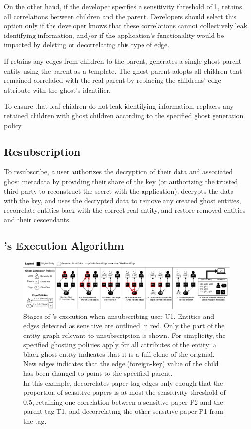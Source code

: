 On the other hand, if the developer specifies a sensitivity threshold of 1, \sys retains all
correlations between children and the parent. Developers should select this option only if the
developer knows that these correlations cannot collectively leak identifying information, and/or if
the application's functionality would be impacted by deleting or decorrelating this type of edge.

If \sys retains any edges from children to the parent, \sys generates a single ghost parent entity using the
parent as a template. The ghost parent adopts all children that remained correlated with the real
parent by replacing the childrens' edge attribute with the ghost's identifier.

To ensure that leaf children do not leak identifying information, 
\sys replaces any retained children with ghost children according to the specified ghost generation
policy.

\subsection{Resubscription}
To resubscribe, a user authorizes the decryption of their data and associated ghost metadata by
providing their share of the key (or authorizing the trusted third party to reconstruct the secret
with the application). \sys decrypts the data with the key, and uses the decrypted data to remove
any created ghost entities, recorrelate entities back with the correct real entity, and restore
removed entities and their descendants. 

\iffalse
\subsection{\sys's Execution Algorithm}
\begin{figure}[ht!]
    \centering
    \includegraphics[width=\textwidth]{img/algo}

    \caption{Stages of \sys's execution when unsubscribing user U1. Entities and edges detected as
    sensitive are outlined in red. Only the part of the entity graph relevant to unsubscription is shown.
    For simplicity, the specified ghosting policies apply for all attributes
    of the entity: a black ghost entity indicates that it is a full clone of the original.
    New edges indicates that the edge (foreign-key) value of the child has been changed to
    point to the specified parent.\\
    In this example, \sys decorrelates paper-tag edges only enough that the proportion of sensitive papers
    is at most the sensitivity threshold of 0.5, retaining one correlation between a sensitive
    paper P2 and the parent tag T1, and decorrelating the other sensitive paper P1 from the tag.}
    \label{fig:algo}
\end{figure}


